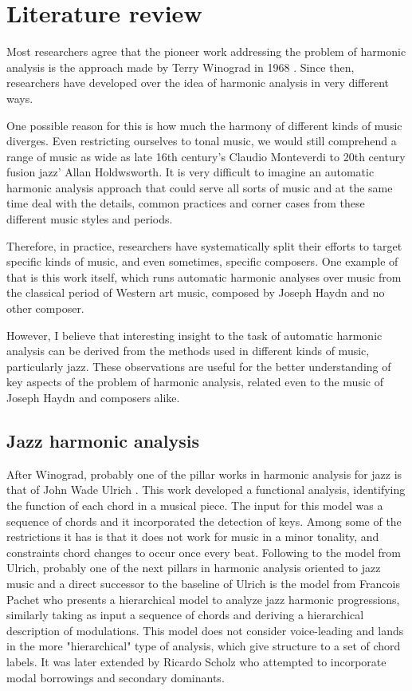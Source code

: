 \chapter{Literature review}
\label{chap:literature-review}
Most researchers agree that the pioneer work addressing the problem of harmonic analysis is the approach made by Terry Winograd in 1968 \cite{winograd1968linguistics}. Since then, researchers have developed over the idea of harmonic analysis in very different ways.

One possible reason for this is how much the harmony of different kinds of music diverges. Even restricting ourselves to tonal music, we would still comprehend a range of music as wide as late 16th century's Claudio Monteverdi to 20th century fusion jazz' Allan Holdwsworth. It is very difficult to imagine an automatic harmonic analysis approach that could serve all sorts of music and at the same time deal with the details, common practices and corner cases from these different music styles and periods.

Therefore, in practice, researchers have systematically split their efforts to target specific kinds of music, and even sometimes, specific composers. One example of that is this work itself, which runs automatic harmonic analyses over music from the classical period of Western art music, composed by Joseph Haydn and no other composer.

 However, I believe that interesting insight to the task of automatic harmonic analysis can be derived from the methods used in different kinds of music, particularly jazz. These observations are useful for the better understanding of key aspects of the problem of harmonic analysis, related even to the music of Joseph Haydn and composers alike.

 \section{Jazz harmonic analysis}
 After Winograd, probably one of the pillar works in harmonic analysis for jazz is that of John Wade Ulrich \cite{ulrich1977analysis}. This work developed a functional analysis, identifying the function of each chord in a musical piece. The input for this model was a sequence of chords and it incorporated the detection of keys. Among some of the restrictions it has is that it does not work for music in a minor tonality, and constraints chord changes to occur once every beat.
 Following to the model from Ulrich, probably one of the next pillars in harmonic analysis oriented to jazz music and a direct successor to the baseline of Ulrich is the model from Francois Pachet \cite{pachet2000computer} who presents a hierarchical model to analyze jazz harmonic progressions, similarly taking as input a sequence of chords and deriving a hierarchical description of modulations. This model does not consider voice-leading and lands in the more "hierarchical" type of analysis, which give structure to a set of chord labels. It was later extended by Ricardo Scholz \cite{scholz2005automating} who attempted to incorporate modal borrowings and secondary dominants.

